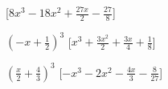 \begin{esercizio}
\begin{multicols}{2}
\begin{enumeratea}
  \hfill [\(8 x^{3} - 18 x^{2} + \frac{27 x}{2} - \frac{27}{8}\)]
\item \(\left(- x + \frac{1}{2}\right)^{3}\)
  \hfill [\(x^{3} + \frac{3 x^{2}}{2} + \frac{3 x}{4} + \frac{1}{8}\)]
\item \(\left(\frac{x}{2} + \frac{4}{3}\right)^{3}\)
  \hfill [\(- x^{3} - 2 x^{2} - \frac{4 x}{3} - \frac{8}{27}\)]
 \end{enumeratea}
\end{multicols}
\end{esercizio}

